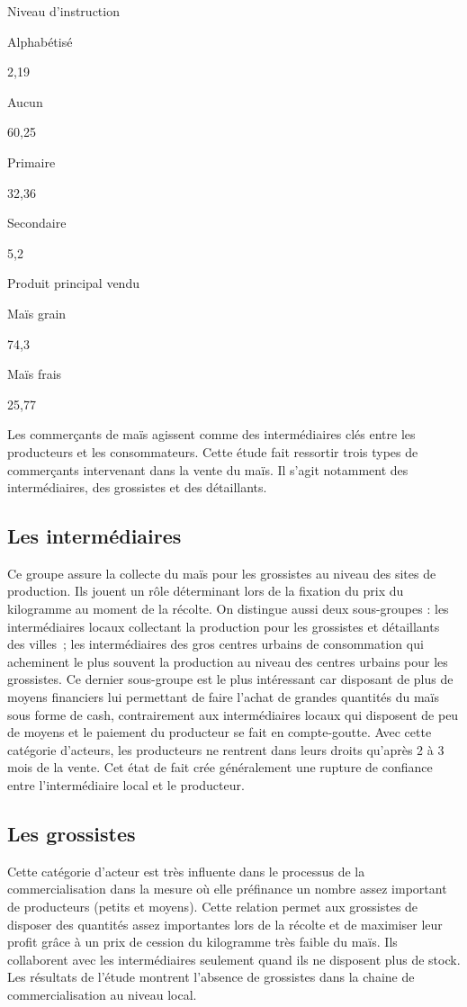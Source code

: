 \documentclass[12pt,oneside]{report}
\begin{document}
Niveau d'instruction

Alphabétisé

2,19

Aucun

60,25

Primaire

32,36

Secondaire

5,2

Produit principal vendu

Maïs grain

74,3

Maïs frais

25,77

Les commerçants de maïs agissent comme des intermédiaires clés entre les producteurs et les consommateurs. Cette étude fait ressortir trois types de commerçants intervenant dans la vente du maïs. Il s’agit notamment des intermédiaires, des grossistes et des détaillants.

\subsection{Les intermédiaires}
Ce groupe assure la collecte du maïs pour les grossistes au niveau des sites de production. Ils jouent un rôle déterminant lors de la fixation du prix du kilogramme au moment de la récolte. On distingue aussi deux sous-groupes : les intermédiaires locaux collectant la production pour les grossistes et détaillants des villes ; les intermédiaires des gros centres urbains de consommation qui acheminent le plus souvent la production au niveau des centres urbains pour les grossistes. Ce dernier sous-groupe est le plus intéressant car disposant de plus de moyens financiers lui permettant de faire l’achat de grandes quantités du maïs sous forme de cash, contrairement aux intermédiaires locaux qui disposent de peu de moyens et le paiement du producteur se fait en compte-goutte. Avec cette catégorie d’acteurs, les producteurs ne rentrent dans leurs droits qu’après 2 à 3 mois de la vente. Cet état de fait crée généralement une rupture de confiance entre l’intermédiaire local et le producteur.

\subsection{Les grossistes}
Cette catégorie d’acteur est très influente dans le processus de la commercialisation dans la mesure où elle préfinance un nombre assez important de producteurs (petits et moyens). Cette relation permet aux grossistes de disposer des quantités assez importantes lors de la récolte et de maximiser leur profit grâce à un prix de cession du kilogramme très faible du maïs. Ils collaborent avec les intermédiaires seulement quand ils ne disposent plus de stock. Les résultats de l’étude montrent l’absence de grossistes dans la chaine de commercialisation au niveau local.
\end{document}
